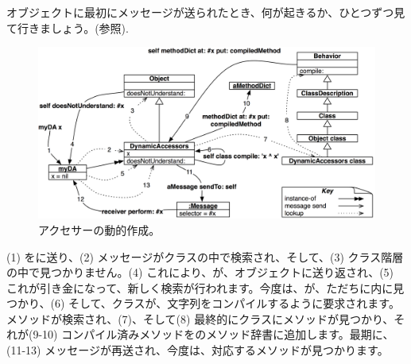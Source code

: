 \documentclass[a4paper,10pt,twoside]{book}
\begin{document}
オブジェクトに最初にメッセージが送られたとき、何が起きるか、ひとつずつ見て行きましょう。(参照).

\begin{figure}[ht]\centering
	\includegraphics[width=\linewidth]{DynamicAccessors}
	\caption{アクセサーの動的作成。\figlabel{DynamicAccessors}}
\end{figure}

(1) をに送り、(2) メッセージがクラスの中で検索され、そして、(3) クラス階層の中で見つかりません。(4) これにより、が、オブジェクトに送り返され、(5) これが引き金になって、新しく検索が行われます。今度は、が、ただちに内に見つかり、(6) そして、クラスが、文字列をコンパイルするように要求されます。メソッドが検索され、(7)、そして(8) 最終的にクラスにメソッドが見つかり、それが(9-10) コンパイル済みメソッドをのメソッド辞書に追加します。最期に、(11-13) メッセージが再送され、今度は、対応するメソッドが見つかります。
\end{document}
